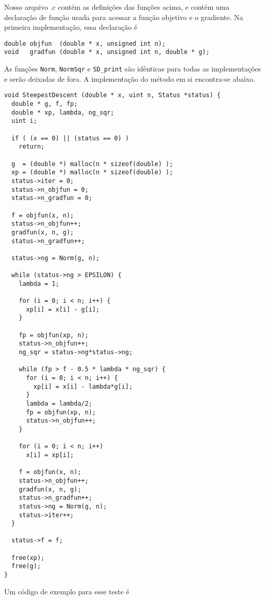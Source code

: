 \documentclass[letterpaper,11pt]{article}
\numberwithin{equation}{section}
\begin{document}
Nosso arquivo .c contém as definições das funções acima, e contém uma declaração de função
usada para acessar a função objetivo e o gradiente. Na primeira implementação, essa declaração
é
\begin{verbatim}
double objfun  (double * x, unsigned int n);
void   gradfun (double * x, unsigned int n, double * g);
\end{verbatim}
As funções \verb+Norm+, \verb+NormSqr+ e \verb+SD_print+ são idênticas para todas as
implementações e serão deixadas de fora. A implementação do método em si encontra-se abaixo.
\scriptsize
\begin{verbatim}
void SteepestDescent (double * x, uint n, Status *status) { 
  double * g, f, fp;
  double * xp, lambda, ng_sqr;
  uint i;

  if ( (x == 0) || (status == 0) )
    return;

  g  = (double *) malloc(n * sizeof(double) );
  xp = (double *) malloc(n * sizeof(double) );
  status->iter = 0;
  status->n_objfun = 0;
  status->n_gradfun = 0;

  f = objfun(x, n);
  status->n_objfun++;
  gradfun(x, n, g);
  status->n_gradfun++;

  status->ng = Norm(g, n);

  while (status->ng > EPSILON) {
    lambda = 1;

    for (i = 0; i < n; i++) {
      xp[i] = x[i] - g[i];
    }

    fp = objfun(xp, n);
    status->n_objfun++;
    ng_sqr = status->ng*status->ng;

    while (fp > f - 0.5 * lambda * ng_sqr) {
      for (i = 0; i < n; i++) {
        xp[i] = x[i] - lambda*g[i];
      }
      lambda = lambda/2;
      fp = objfun(xp, n);
      status->n_objfun++;
    }

    for (i = 0; i < n; i++)
      x[i] = xp[i];

    f = objfun(x, n);
    status->n_objfun++;
    gradfun(x, n, g);
    status->n_gradfun++;
    status->ng = Norm(g, n);
    status->iter++;
  }

  status->f = f;

  free(xp);
  free(g);
}
\end{verbatim}
\normalsize
Um código de exemplo para esse teste é
\scriptsize
\end{document}
